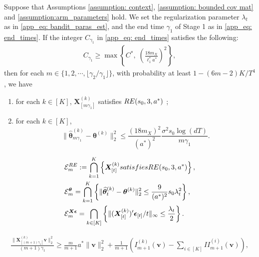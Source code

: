 \documentclass[10pt,a4paper]{amsart}
\newcommand{\bX}{\boldsymbol{X}}
\newcommand{\bd}[1]{\boldsymbol{#1}}
\newcommand{\bepsilon}{\bd{\epsilon}}
\newcommand{\btheta}{\boldsymbol{\theta}}
\newcommand{\bv}{\boldsymbol{v}}
\newcommand{\hbtheta}{\widehat{\boldsymbol{\theta}}}
\newcommand{\mE}{\mathcal{E}}
\begin{document}
\begin{lemma} \label{lemma: RE and estimation error of stage 2}
Suppose that Assumptions \ref{assumption: context}, \ref{assumption: bounded cov mat} and \ref{assumption:arm_parameters} hold. We set the regularization parameter $\lambda_t$ as in \eqref{app_eq: bandit_paras_est}, and the end time $\gamma_1$ of Stage 1 as in \eqref{app_eq: end_times}.
If the integer $C_{\gamma_1}$ in \eqref{app_eq: end_times} satisfies the following:
\begin{align}
    \label{eq: lambda_gamma_1}
     C_{\gamma_1} \ge \max\left\{C^*,\; \left(\frac{18m_X}{\ell_1^* a^*}\right)^2\right\},
\end{align}
then for each  $m \in \{1,2,\cdots,\lfloor \gamma_2/\gamma_1 \rfloor\}$, with probability at least $1-(6m-2)K/T^4$, we have
\begin{enumerate}[label=\roman*)]
    \item for each $k \in [K]$, $\bX_{[m\gamma_1]}^{(k)}$ satisfies $\textup{RE}(s_0,3,a^*)$ ;
    \item for each $k \in [K]$,
    $$
    \|\hbtheta_{m\gamma_1}^{(k)}-\btheta^{(k)}\|_2^2\le   \frac{(18m_{X})^2}{(a^*)^2}  \frac{\sigma^2 s_0\log (dT)}{m\gamma_1}.
    $$
\end{enumerate}
\end{lemma}

\begin{align}\label{def:stage2_events}
\begin{split}
&  \mE_m^{\textup{RE}} := \bigcap_{k = 1}^{K} \left\{\bX_{[t]}^{(k)} \textup{ satisfies } \textup{RE}(s_0,3, a^*)\right\}, \\
&\mE_m^{\btheta} = \bigcap_{k = 1}^{K}\left\{\|\hbtheta_t^{(k)}-\btheta^{(k)}\|_2^2 \le \frac{9}{(a^*)^2}s_0\lambda_t^2\right\},    \\
&\mE_m^{\bX\bepsilon} = \bigcap_{k\in [K]} \left\{\|{(\bX_{[t]}^{(k)}})' \bepsilon_{[t]}/t\|_{\infty} 
\le \frac{\lambda_t}{2} \right\}.
\end{split}
\end{align}

\begin{equation}\label{eq: stage 2 RE 1}
\begin{aligned}
   \frac{\|\bX_{[(m+1)\gamma_1]}^{(k)} \bv\|_2^2}{(m+1)\gamma_1} \geq \frac{m}{m+1} a^*\|\bv\|_2^2 + \frac{1}{m+1} \left(I_{m+1}^{(k)}(\bv) - \sum_{i \in [K]} II_{m+1}^{(i)}(\bv) \right), 
\end{aligned}
\end{equation}
\end{document}
